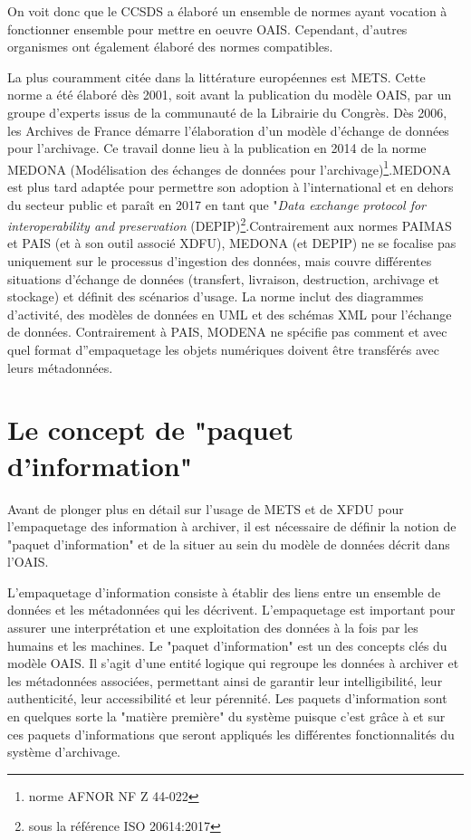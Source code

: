 \documentclass[12pt,a4paper]{article} %
\begin{document}
On voit donc que le CCSDS a élaboré un ensemble de normes ayant vocation à fonctionner ensemble pour mettre en oeuvre OAIS. Cependant, d'autres organismes ont également élaboré des normes compatibles. 

La plus couramment citée dans la littérature européennes est METS. Cette norme a été élaboré dès 2001, soit avant la publication du modèle OAIS, par un groupe d'experts issus de la communauté de la Librairie du Congrès. Dès 2006, les Archives de France démarre l'élaboration d'un modèle d'échange de données pour l'archivage. Ce travail donne lieu à la publication en 2014 de la norme MEDONA (Modélisation des échanges de données pour l'archivage)\footnote{norme AFNOR NF Z 44-022}.MEDONA est plus tard adaptée pour permettre son adoption à l'international et en dehors du secteur public et paraît en 2017 en tant que "\textit{Data exchange protocol for interoperability and preservation} (DEPIP)\footnote{sous la référence ISO 20614:2017}.Contrairement aux normes PAIMAS et PAIS (et à son outil associé XDFU), MEDONA (et DEPIP) ne se focalise pas uniquement sur le processus d'ingestion des données, mais couvre différentes situations d'échange de données (transfert, livraison, destruction, archivage et stockage) et définit des scénarios d'usage. La norme inclut des diagrammes d'activité, des modèles de données en UML et des schémas XML pour l'échange de données. Contrairement à PAIS, MODENA ne spécifie pas comment et avec quel format d''empaquetage les objets numériques doivent être transférés avec leurs métadonnées\autocite{grimouard_data_2014}. 


\section{Le concept de "paquet d'information"}
Avant de plonger plus en détail sur l'usage de METS et de XFDU pour l'empaquetage des information à archiver, il est nécessaire de définir la notion de "paquet d'information" et de la situer au sein du modèle de données décrit dans l'OAIS. 

L'empaquetage d'information consiste à établir des liens entre un ensemble de données et les métadonnées qui les décrivent. L'empaquetage est important pour assurer une interprétation et une exploitation des données à la fois par les humains et les machines. Le "paquet d'information" est un des concepts clés du modèle OAIS. Il s'agit d'une entité logique qui regroupe les données à archiver et les métadonnées associées, permettant ainsi de garantir leur intelligibilité, leur authenticité, leur accessibilité et leur pérennité. Les paquets d'information sont en quelques sorte la "matière première" du système puisque c'est grâce à et sur ces paquets d'informations que seront appliqués les différentes fonctionnalités du système d'archivage. 
\end{document}
